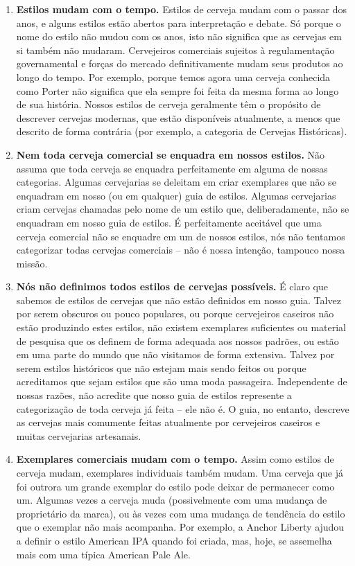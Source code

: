 \begin{enumerate}
\item \textbf{Estilos mudam com o tempo.} Estilos de cerveja mudam com o passar dos anos, e alguns estilos estão abertos para interpretação e debate. Só porque o nome do estilo não mudou com os anos, isto não significa que as cervejas em si também não mudaram. Cervejeiros comerciais sujeitos à regulamentação governamental e forças do mercado definitivamente mudam seus produtos ao longo do tempo. Por exemplo, porque temos agora uma cerveja conhecida como Porter não significa que ela sempre foi feita da mesma forma ao longo de sua história. Nossos estilos de cerveja geralmente têm o propósito de descrever cervejas modernas, que estão disponíveis atualmente, a menos que descrito de forma contrária (por exemplo, a categoria de Cervejas Históricas).
\item \textbf{Nem toda cerveja comercial se enquadra em nossos estilos.} Não assuma que toda cerveja se enquadra perfeitamente em alguma de nossas categorias. Algumas cervejarias se deleitam em criar exemplares que não se enquadram em nosso (ou em qualquer) guia de estilos. Algumas cervejarias criam cervejas chamadas pelo nome de um estilo que, deliberadamente, não se enquadram em nosso guia de estilos. É perfeitamente aceitável que uma cerveja comercial não se enquadre em um de nossos estilos, nós não tentamos categorizar todas cervejas comerciais – não é nossa intenção, tampouco nossa missão.
\item \textbf{Nós não definimos todos estilos de cervejas possíveis.} É claro que sabemos de estilos de cervejas que não estão definidos em nosso guia. Talvez por serem obscuros ou pouco populares, ou porque cervejeiros caseiros não estão produzindo estes estilos, não existem exemplares suficientes ou material de pesquisa que os definem de forma adequada aos nossos padrões, ou estão em uma parte do mundo que não visitamos de forma extensiva. Talvez por serem estilos históricos que não estejam mais sendo feitos ou porque acreditamos que sejam estilos que são uma moda passageira. Independente de nossas razões, não acredite que nosso guia de estilos represente a categorização de toda cerveja já feita – ele não é. O guia, no entanto, descreve as cervejas mais comumente feitas atualmente por cervejeiros caseiros e muitas cervejarias artesanais.
\item \textbf{Exemplares comerciais mudam com o tempo.} Assim como estilos de cerveja mudam, exemplares individuais também mudam. Uma cerveja que já foi outrora um grande exemplar do estilo pode deixar de permanecer como um. Algumas vezes a cerveja muda (possivelmente com uma mudança de proprietário da marca), ou às vezes com uma mudança de tendência do estilo que o exemplar não mais acompanha. Por exemplo, a Anchor Liberty ajudou a definir o estilo American IPA quando foi criada, mas, hoje, se assemelha mais com uma típica American Pale Ale.

\end{enumerate}
